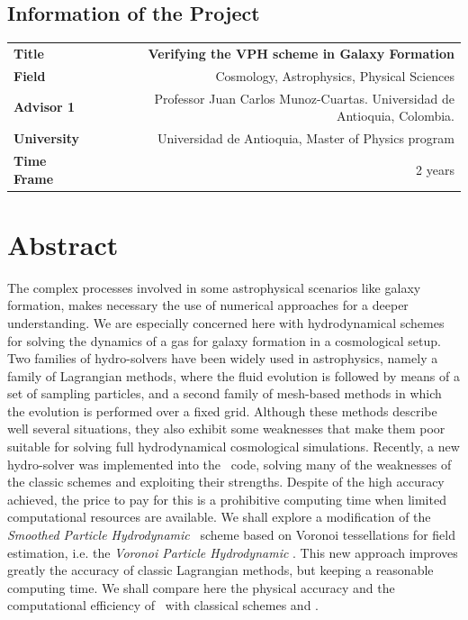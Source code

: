 \documentclass[a4,useAMS,usenatbib,usegraphicx,12pt]{article}
\begin{document}
\subsection*{Information of the Project}
\begin{tabular}{L!{\VRule}R}
\bf Title		& \bf Verifying the VPH scheme in Galaxy Formation\\
\bf Field		& Cosmology, Astrophysics, Physical Sciences \\
\bf Advisor 1	& Professor Juan Carlos Munoz-Cuartas. Universidad de Antioquia, Colombia.\\
\bf University	& Universidad de Antioquia, Master of Physics program \\
\bf Time Frame	& 2 years \\
\end{tabular}
\normalsize

\section{Abstract}

The complex processes involved in some astrophysical scenarios like galaxy 
formation, makes necessary the use of numerical approaches for a deeper 
understanding. We are especially concerned here with hydrodynamical schemes for
solving the dynamics of a gas for galaxy formation in a cosmological setup.
Two families of hydro-solvers have been widely used in astrophysics, namely a
family of Lagrangian methods, where the fluid evolution is followed by means of
a set of sampling particles, and a second family of mesh-based methods in 
which the evolution is performed over a fixed grid. Although these methods 
describe well several situations, they also exhibit some weaknesses that make 
them poor suitable for solving full hydrodynamical cosmological simulations.
Recently, a new hydro-solver was implemented into the \AREPO\ code, solving many 
of the weaknesses of the classic schemes and exploiting their strengths. Despite
of the high accuracy achieved, the price to pay for this is a prohibitive 
computing time when limited computational resources are available. We shall 
explore a modification of the \textit{Smoothed Particle Hydrodynamic} \SPH\ scheme
based on Voronoi tessellations for field estimation, i.e. the \textit{Voronoi 
Particle Hydrodynamic} \VPH. This new approach improves greatly the accuracy of 
classic Lagrangian methods, but keeping a reasonable computing time. We shall 
compare here the physical accuracy and the computational efficiency of \VPH\ 
with classical schemes and \AREPO.
\end{document}
